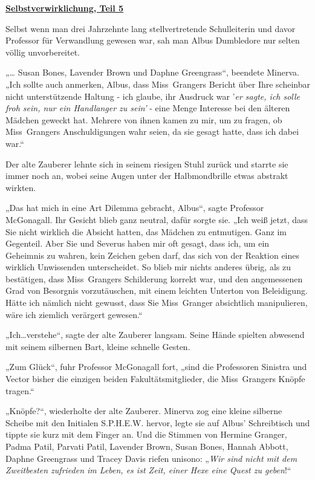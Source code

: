 

\hypertarget{selbstverwirklichung-teil-5}{%

\textbf{\uline{Selbstverwirklichung, Teil 5}}

Selbst wenn man drei Jahrzehnte lang stellvertretende Schulleiterin und davor Professor für Verwandlung gewesen war, sah man Albus Dumbledore nur selten völlig unvorbereitet.

„… Susan Bones, Lavender Brown und Daphne Greengrass“, beendete Minerva. „Ich sollte auch anmerken, Albus, dass Miss~Grangers Bericht über Ihre scheinbar nicht unterstützende Haltung - ich glaube, ihr Ausdruck war '\emph{er sagte, ich solle froh sein, nur ein Handlanger zu sein'} - eine Menge Interesse bei den älteren Mädchen geweckt hat. Mehrere von ihnen kamen zu mir, um zu fragen, ob Miss~Grangers Anschuldigungen wahr seien, da sie gesagt hatte, dass ich dabei war.“

Der alte Zauberer lehnte sich in seinem riesigen Stuhl zurück und starrte sie immer noch an, wobei seine Augen unter der Halbmondbrille etwas abstrakt wirkten.

„Das hat mich in eine Art Dilemma gebracht, Albus“, sagte Professor McGonagall. Ihr Gesicht blieb ganz neutral, dafür sorgte sie. „Ich weiß jetzt, dass Sie nicht wirklich die Absicht hatten, das Mädchen zu entmutigen. Ganz im Gegenteil. Aber Sie und Severus haben mir oft gesagt, dass ich, um ein Geheimnis zu wahren, kein Zeichen geben darf, das sich von der Reaktion eines wirklich Unwissenden unterscheidet. So blieb mir nichts anderes übrig, als zu bestätigen, dass Miss~Grangers Schilderung korrekt war, und den angemessenen Grad von Besorgnis vorzutäuschen, mit einem leichten Unterton von Beleidigung. Hätte ich nämlich nicht gewusst, dass Sie Miss~Granger absichtlich manipulieren, wäre ich ziemlich verärgert gewesen.“

„Ich…verstehe“, sagte der alte Zauberer langsam. Seine Hände spielten abwesend mit seinem silbernen Bart, kleine schnelle Gesten.

„Zum Glück“, fuhr Professor McGonagall fort, „sind die Professoren Sinistra und Vector bisher die einzigen beiden Fakultätsmitglieder, die Miss~Grangers Knöpfe tragen.“

„Knöpfe?“, wiederholte der alte Zauberer. Minerva zog eine kleine silberne Scheibe mit den Initialen S.P.H.E.W. hervor, legte sie auf Albus' Schreibtisch und tippte sie kurz mit dem Finger an. Und die Stimmen von Hermine Granger, Padma Patil, Parvati Patil, Lavender Brown, Susan Bones, Hannah Abbott, Daphne Greengrass und Tracey Davis riefen unisono: „\emph{Wir sind nicht mit dem Zweitbesten zufrieden im Leben, es ist Zeit, einer Hexe eine Quest zu geben}!“

}
